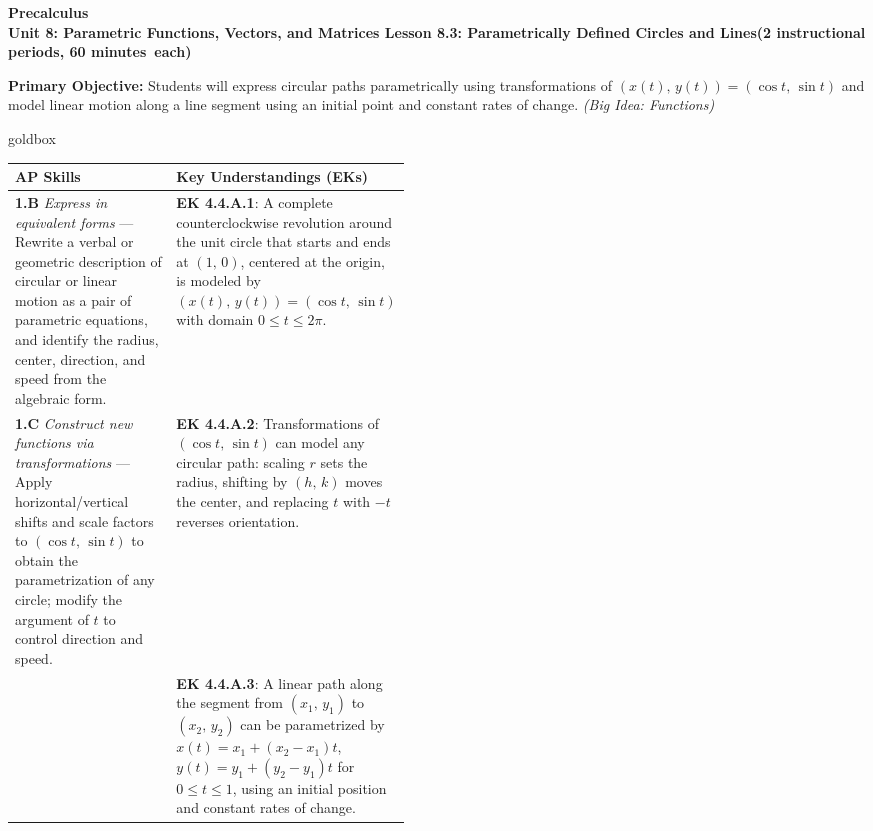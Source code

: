 \documentclass[10pt]{article}
\newcommand{\CourseName}{Precalculus}
\newcommand{\MeetingLength}{60 minutes}
\newcommand{\UnitNumberName}{Unit 8: Parametric Functions, Vectors, and Matrices \quad}
\newcommand{\LessonNumberName}{Lesson 8.3: Parametrically Defined Circles and Lines}
\begin{document}
\begin{center}
  {\Large\bfseries \CourseName} \\[4pt]
  {\small\bfseries \UnitNumberName \LessonNumberName \quad (2 instructional periods, \MeetingLength\ each)}
\end{center}

\begin{tcolorbox}[colback=sky, colframe=navy, boxrule=0.9pt, arc=2mm,
    left=2mm, right=2mm, top=1.5mm, bottom=1.5mm]
  \textbf{Primary Objective:} Students will express circular paths
  parametrically using transformations of $(x(t),\,y(t)) = (\cos t,\,\sin t)$
  and model linear motion along a line segment using an initial point and
  constant rates of change. \textit{(Big Idea: Functions)}
\end{tcolorbox}

\vspace{0.08in}

\begin{skillbox}{goldbox}
\begin{tabularx}{\linewidth}{@{} p{0.46\linewidth} X @{}}
\textbf{AP Skills} & \textbf{Key Understandings (EKs)} \\
\midrule
\textbf{1.B} \textit{Express in equivalent forms} ---
  Rewrite a verbal or geometric description of circular or linear
  motion as a pair of parametric equations, and identify the radius,
  center, direction, and speed from the algebraic form.
&
\textbf{EK 4.4.A.1}: A complete counterclockwise revolution around
the unit circle that starts and ends at $(1,\,0)$, centered at the
origin, is modeled by $(x(t),\,y(t)) = (\cos t,\,\sin t)$ with
domain $0 \le t \le 2\pi$. \\[4pt]

\textbf{1.C} \textit{Construct new functions via transformations} ---
  Apply horizontal/vertical shifts and scale factors to $(\cos t,\,\sin t)$
  to obtain the parametrization of any circle; modify the argument of
  $t$ to control direction and speed.
&
\textbf{EK 4.4.A.2}: Transformations of $(\cos t,\,\sin t)$ can model
any circular path: scaling $r$ sets the radius, shifting by $(h,\,k)$
moves the center, and replacing $t$ with $-t$ reverses orientation. \\[4pt]

&
\textbf{EK 4.4.A.3}: A linear path along the segment from
$(x_1,\,y_1)$ to $(x_2,\,y_2)$ can be parametrized by
$x(t)=x_1+(x_2-x_1)t$, $y(t)=y_1+(y_2-y_1)t$ for $0\le t\le 1$,
using an initial position and constant rates of change. \\
\end{tabularx}
\end{skillbox}
\end{document}
